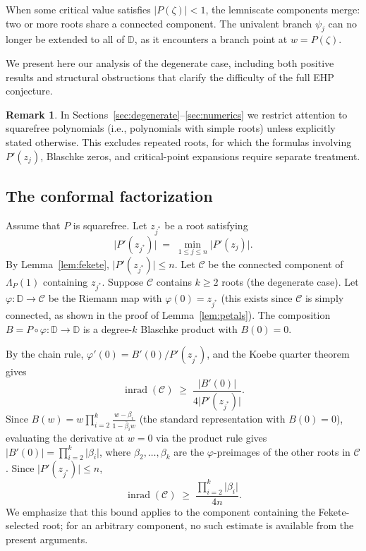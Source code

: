 \documentclass[11pt,a4paper]{amsart}
\theoremstyle{definition}
\newtheorem{remark}[theorem]{Remark}
\newcommand{\D}{\mathbb{D}}
\newcommand{\abs}[1]{\lvert #1 \rvert}
\newcommand{\inrad}{\operatorname{inrad}}
\begin{document}
When some critical value satisfies $\abs{P(\zeta)} < 1$, the lemniscate
components merge: two or more roots share a connected component.
The univalent branch $\psi_j$ can no longer be extended to all of $\D$,
as it encounters a branch point at $w = P(\zeta)$.

We present here our analysis of the degenerate case, including both
positive results and structural obstructions that clarify the difficulty of
the full EHP conjecture.

\begin{remark}\label{rem:squarefree-degenerate}
In Sections~\ref{sec:degenerate}--\ref{sec:numerics} we restrict attention
to squarefree polynomials (i.e., polynomials with simple roots) unless
explicitly stated otherwise.  This excludes repeated roots, for which the
formulas involving $P'(z_j)$, Blaschke zeros, and critical-point expansions
require separate treatment.
\end{remark}

\subsection{The conformal factorization}

Assume that $P$ is squarefree.
Let $z_{j^*}$ be a root satisfying
\[
  \abs{P'(z_{j^*})} \;=\; \min_{1 \leq j \leq n} \abs{P'(z_j)}.
\]
By Lemma~\ref{lem:fekete}, $\abs{P'(z_{j^*})} \leq n$.
Let $\mathcal{C}$ be the connected
component of $\Lambda_P(1)$ containing $z_{j^*}$.
Suppose $\mathcal{C}$ contains $k \geq 2$ roots (the degenerate case).
Let $\varphi \colon \D \to \mathcal{C}$ be the
Riemann map with $\varphi(0) = z_{j^*}$
(this exists since $\mathcal{C}$ is simply connected, as shown in
the proof of Lemma~\ref{lem:petals}).
The composition $B = P \circ \varphi \colon \D \to \D$ is a
degree-$k$ Blaschke product with $B(0) = 0$.

By the chain rule, $\varphi'(0) = B'(0)/P'(z_{j^*})$, and the
Koebe quarter theorem gives
\begin{equation}\label{eq:blaschke-inradius}
  \inrad(\mathcal{C}) \;\geq\; \frac{\abs{B'(0)}}{4\abs{P'(z_{j^*})}}.
\end{equation}
Since $B(w) = w \prod_{i=2}^k \frac{w - \beta_i}{1 - \bar\beta_i w}$
(the standard representation with $B(0) = 0$),
evaluating the derivative at $w = 0$ via the product rule gives
$\abs{B'(0)} = \prod_{i=2}^k \abs{\beta_i}$, where $\beta_2,
\ldots, \beta_k$ are the $\varphi$-preimages of the other roots in
$\mathcal{C}$.  Since $\abs{P'(z_{j^*})} \leq n$,
\[
  \inrad(\mathcal{C}) \;\geq\;
  \frac{\prod_{i=2}^k \abs{\beta_i}}{4n}.
\]
We emphasize that this bound applies to the component containing the
Fekete-selected root; for an arbitrary component, no such estimate is
available from the present arguments.
\end{document}

